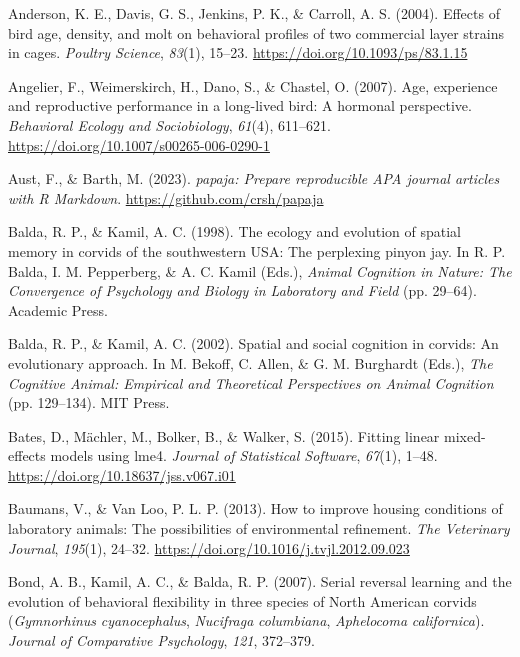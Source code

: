 \documentclass[
  pub]{apa6}
\newlength{\cslhangindent}
\newenvironment{CSLReferences}[2] %
 {\begin{list}{}{%
  \setlength{\itemindent}{0pt}
  \setlength{\leftmargin}{0pt}
  \setlength{\parsep}{0pt}
  \ifodd #1
   \setlength{\leftmargin}{\cslhangindent}
   \setlength{\itemindent}{-1\cslhangindent}
  \fi
  \setlength{\itemsep}{#2\baselineskip}}}
 {\end{list}}
\begin{document}
\label{refs}
\begin{CSLReferences}{1}{0}
Anderson, K. E., Davis, G. S., Jenkins, P. K., \& Carroll, A. S. (2004). Effects of bird age, density, and molt on behavioral profiles of two commercial layer strains in cages. \emph{Poultry Science}, \emph{83}(1), 15--23. \url{https://doi.org/10.1093/ps/83.1.15}

Angelier, F., Weimerskirch, H., Dano, S., \& Chastel, O. (2007). Age, experience and reproductive performance in a long-lived bird: A hormonal perspective. \emph{Behavioral Ecology and Sociobiology}, \emph{61}(4), 611--621. \url{https://doi.org/10.1007/s00265-006-0290-1}

Aust, F., \& Barth, M. (2023). \emph{{papaja}: {Prepare} reproducible {APA} journal articles with {R Markdown}}. \url{https://github.com/crsh/papaja}

Balda, R. P., \& Kamil, A. C. (1998). The ecology and evolution of spatial memory in corvids of the southwestern {USA}: {The} perplexing pinyon jay. In R. P. Balda, I. M. Pepperberg, \& A. C. Kamil (Eds.), \emph{Animal {Cognition} in {Nature}: {The Convergence} of {Psychology} and {Biology} in {Laboratory} and {Field}} (pp. 29--64). Academic Press.

Balda, R. P., \& Kamil, A. C. (2002). Spatial and social cognition in corvids: An evolutionary approach. In M. Bekoff, C. Allen, \& G. M. Burghardt (Eds.), \emph{The {Cognitive Animal}: {Empirical} and {Theoretical Perspectives} on {Animal Cognition}} (pp. 129--134). MIT Press.

Bates, D., Mächler, M., Bolker, B., \& Walker, S. (2015). Fitting linear mixed-effects models using {lme4}. \emph{Journal of Statistical Software}, \emph{67}(1), 1--48. \url{https://doi.org/10.18637/jss.v067.i01}

Baumans, V., \& Van Loo, P. L. P. (2013). How to improve housing conditions of laboratory animals: {The} possibilities of environmental refinement. \emph{The Veterinary Journal}, \emph{195}(1), 24--32. \url{https://doi.org/10.1016/j.tvjl.2012.09.023}

Bond, A. B., Kamil, A. C., \& Balda, R. P. (2007). Serial reversal learning and the evolution of behavioral flexibility in three species of {North American} corvids ({\emph{Gymnorhinus}}{ \emph{cyanocephalus}}, {\emph{Nucifraga}}{ \emph{columbiana}}, {\emph{Aphelocoma}}{ \emph{californica}}). \emph{Journal of Comparative Psychology}, \emph{121}, 372--379.


\end{CSLReferences}
\end{document}
